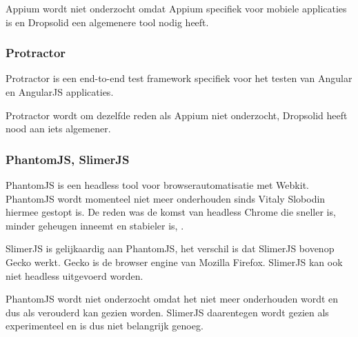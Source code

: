 Appium wordt niet onderzocht omdat Appium specifiek voor mobiele applicaties is en Dropsolid een algemenere \gls{tool} nodig heeft.


\subsubsection{Protractor}

Protractor is een end-to-end test \gls{framework} specifiek voor het testen van Angular en AngularJS applicaties.

Protractor wordt om dezelfde reden als Appium niet onderzocht, Dropsolid heeft nood aan iets algemener.

\subsubsection{PhantomJS, SlimerJS}
PhantomJS is een \gls{headless} \gls{tool} voor browserautomatisatie met Webkit. PhantomJS wordt momenteel niet meer onderhouden sinds Vitaly Slobodin hiermee gestopt is. De reden was de komst van \gls{headless} Chrome die sneller is, minder geheugen inneemt en stabieler is, \textcite{Slobodin2017}.

SlimerJS is gelijkaardig aan PhantomJS, het verschil is dat SlimerJS bovenop Gecko werkt. Gecko is de browser engine van Mozilla Firefox. SlimerJS kan ook niet \gls{headless} uitgevoerd worden.

PhantomJS wordt niet onderzocht omdat het niet meer onderhouden wordt en dus als verouderd kan gezien worden. SlimerJS daarentegen wordt gezien als experimenteel en is dus niet belangrijk genoeg.





